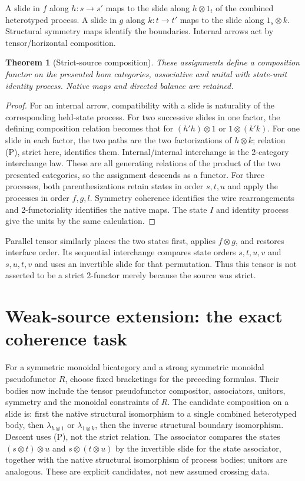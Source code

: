 \documentclass[11pt]{article}
\newtheorem{theorem}{Theorem}\newtheorem{proposition}{Proposition}
\begin{document}
A slide in $f$ along $h:s\to s'$ maps to the slide along $h\otimes1_t$ of the combined heterotyped process. A slide in $g$ along $k:t\to t'$ maps to the slide along $1_s\otimes k$. Structural symmetry maps identify the boundaries. Internal arrows act by tensor/horizontal composition.

\begin{theorem}[Strict-source composition]
These assignments define a composition functor on the presented hom categories, associative and unital with state-unit identity process. Native maps and directed balance are retained.
\end{theorem}
\begin{proof}
For an internal arrow, compatibility with a slide is naturality of the corresponding held-state process. For two successive slides in one factor, the defining composition relation becomes that for $(h'h)\otimes1$ or $1\otimes(k'k)$. For one slide in each factor, the two paths are the two factorizations of $h\otimes k$; relation (P), strict here, identifies them. Internal/internal interchange is the 2-category interchange law. These are all generating relations of the product of the two presented categories, so the assignment descends as a functor.
For three processes, both parenthesizations retain states in order $s,t,u$ and apply the processes in order $f,g,l$. Symmetry coherence identifies the wire rearrangements and 2-functoriality identifies the native maps. The state $I$ and identity process give the units by the same calculation.
\end{proof}
Parallel tensor similarly places the two states first, applies $f\otimes g$, and restores interface order. Its sequential interchange compares state orders $s,t,u,v$ and $s,u,t,v$ and uses an invertible slide for that permutation. Thus this tensor is not asserted to be a strict 2-functor merely because the source was strict.

\section{Weak-source extension: the exact coherence task}
For a symmetric monoidal bicategory and a strong symmetric monoidal pseudofunctor $R$, choose fixed bracketings for the preceding formulas. Their bodies now include the tensor pseudofunctor compositor, associators, unitors, symmetry and the monoidal constraints of $R$.
The candidate composition on a slide is: first the native structural isomorphism to a single combined heterotyped body, then $\lambda_{h\otimes1}$ or $\lambda_{1\otimes k}$, then the inverse structural boundary isomorphism. Descent uses (P), not the strict relation. The associator compares the states $(s\otimes t)\otimes u$ and $s\otimes(t\otimes u)$ by the invertible slide for the state associator, together with the native structural isomorphism of process bodies; unitors are analogous. These are explicit candidates, not new assumed crossing data.
\end{document}
